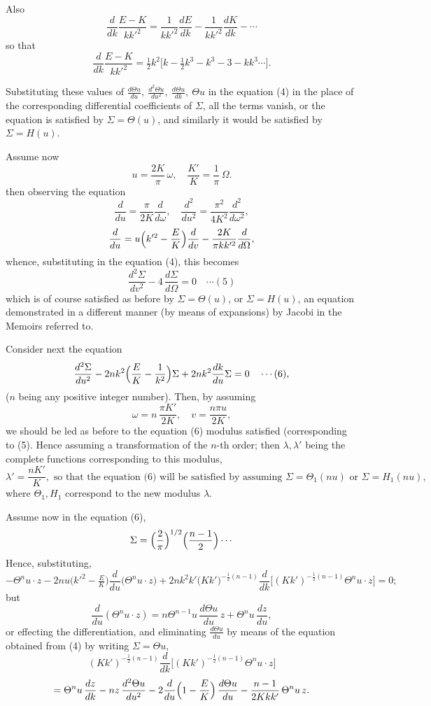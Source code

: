 \documentclass[12pt,a4paper]{article}
\begin{document}
Also
\[
\frac{d}{dk}\frac{E - K}{k k'^2} = \frac{1}{k k'^2}\frac{dE}{dk} - \frac{1}{k k'^2}\frac{dK}{dk} - \cdots
\]
so that
\[
\frac{d}{dk}\frac{E - K}{k k'^2} = \tfrac12 k^2\bigl[k - \tfrac12 k^3 - k^3 - 3 - k k^3\cdots\bigr].
\]

Substituting these values of $\frac{d\Theta u}{du},\ \frac{d^2\Theta u}{du^2},\ \frac{d\Theta u}{dk},\ \Theta u$ in the equation (4) in the place of the corresponding differential coefficients of $\Sigma$, all the terms vanish, or the equation is satisfied by $\Sigma = \Theta(u)$, and similarly it would be satisfied by $\Sigma = H(u)$.

Assume now
\[
u = \frac{2K}{\pi}\,\omega,\quad \frac{K'}{K} = \frac{1}{\pi}\,\Omega.
\]
then observing the equation
\[
\frac{d}{du} = \frac{\pi}{2K}\frac{d}{d\omega},\quad \frac{d^2}{du^2} = \frac{\pi^2}{4K^2}\frac{d^2}{d\omega^2},
\]
\[
\frac{d}{du} = u\Bigl(k'^2 - \frac{E}{K}\Bigr)\frac{d}{dv} - \frac{2K}{\pi k k'^2}\frac{d}{d\Omega},
\]
whence, substituting in the equation (4), this becomes
\[
\frac{d^2\Sigma}{dv^2} - 4\,\frac{d\Sigma}{d\Omega} = 0 \quad\cdots(5)
\]
which is of course satisfied as before by $\Sigma = \Theta(u)$, or $\Sigma = H(u)$, an equation demonstrated in a different manner (by means of expansions) by Jacobi in the Memoirs referred to.

Consider next the equation
\[
\frac{d^2\Sigma}{du^2} - 2n k^2\Bigl(\frac{E}{K} - \frac{1}{k^2}\Bigr)\Sigma + 2nk^2\frac{dk}{du}\Sigma = 0 \quad\cdots(6),
\]
($n$ being any positive integer number). Then, by assuming
\[
\omega = n\,\frac{\pi K'}{2K},\quad v = \frac{n\pi u}{2K},
\]
we should be led as before to the equation (6) modulus satisfied (corresponding to (5). Hence assuming a transformation of the $n$-th order; then $\lambda, \lambda'$ being the complete functions corresponding to this modulus,
\[
\lambda' = \frac{n K'}{K},\text{ so that the equation (6) will be satisfied by assuming }\Sigma = \Theta_1(nu) \text{ or } \Sigma = H_1(nu),
\]
where $\Theta_1, H_1$ correspond to the new modulus $\lambda$.

Assume now in the equation (6),
\[
\Sigma = \Bigl(\frac{2}{\pi}\Bigr)^{1/2}\Bigl(\frac{n-1}{2}\Bigr)\cdots
\]
Hence, substituting,
\[
-\Theta^n u \cdot z - 2nu\bigl(k'^2 - \tfrac{E}{K}\bigr)\frac{d}{du}\bigl(\Theta^n u \cdot z\bigr) + 2nk^2 k'\bigl(K k'\bigr)^{-\tfrac12 (n-1)}\frac{d}{dk}\bigl[(K k')^{-\tfrac12(n-1)}\Theta^n u \cdot z\bigr] = 0;
\]
but
\[
\frac{d}{du}(\Theta^n u\cdot z) = n\Theta^{n-1} u\,\frac{d\Theta u}{du}\,z + \Theta^n u\,\frac{dz}{du},
\]
or effecting the differentiation, and eliminating $\frac{d\Theta u}{du}$ by means of the equation obtained from (4) by writing $\Sigma = \Theta u$,
\[
(K k')^{-\tfrac12(n-1)}\frac{d}{dk}\bigl[(K k')^{-\tfrac12(n-1)}\Theta^n u \cdot z\bigr]
\]
\[
= \Theta^n u\,\frac{dz}{dk} - nz\,\frac{d^2\Theta u}{du^2} - 2\frac{d}{du}\Bigl(1 - \frac{E}{K}\Bigr)\,\frac{d\Theta u}{du} - \frac{n-1}{2K k k'}\,\Theta^n u\,z.
\]
\end{document}
